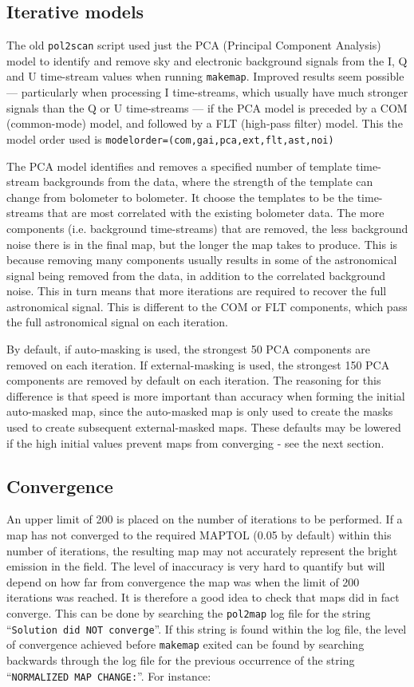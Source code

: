 \documentclass[twoside,11pt]{starlink}
\begin{document}
\subsection{Iterative models}

The old \texttt{pol2scan} script used just the PCA (Principal Component
Analysis) model to identify and remove sky and electronic background
signals from the I, Q and U time-stream values when running
\texttt{makemap}. Improved results seem possible --- particularly when
processing I time-streams, which usually have much stronger signals than the
Q or U time-streams --- if the PCA model is preceded by a COM
(common-mode) model, and followed by a FLT (high-pass filter) model. This
the model order used is \texttt{modelorder=(com,gai,pca,ext,flt,ast,noi)}

The PCA model identifies and removes a specified number of template
time-stream backgrounds from the data, where the strength of the template
can change from bolometer to bolometer. It choose the templates to be the
time-streams that are most correlated with the existing bolometer data.
The more components (i.e. background time-streams) that are removed, the
less background noise there is in the final map, but the longer the map
takes to produce. This is because removing many components usually
results in some of the astronomical signal being removed from the data, in
addition to the correlated background noise. This in turn means that more
iterations are required to recover the full astronomical signal. This is
different to the COM or FLT components, which pass the full astronomical
signal on each iteration.

By default, if auto-masking is used, the strongest 50 PCA components are
removed on each iteration. If external-masking is used, the strongest 150
PCA components are removed by default on each iteration. The reasoning
for this difference is that speed is more important than accuracy when
forming the initial auto-masked map, since the auto-masked map is only
used to create the masks used to create subsequent external-masked maps.
These defaults may be lowered if the high initial values prevent maps
from converging - see the next section.

\subsection{Convergence}
An upper limit of 200 is placed on the number of iterations to be
performed. If a map has not converged to the required MAPTOL (0.05 by
default) within this number of iterations, the resulting map may not
accurately represent the bright emission in the field. The level of
inaccuracy is very hard to quantify but will depend on how far from
convergence the map was when the limit of 200 iterations was reached. It
is therefore a good idea to check that maps did in fact converge. This
can be done by searching the \texttt{pol2map} log file for the string
``\texttt{Solution did NOT converge}''. If this string is found within
the log file, the level of convergence achieved before \texttt{makemap}
exited can be found by searching backwards through the log file for the
previous occurrence of the string ``\texttt{NORMALIZED MAP CHANGE:}''. For
instance:
\end{document}
